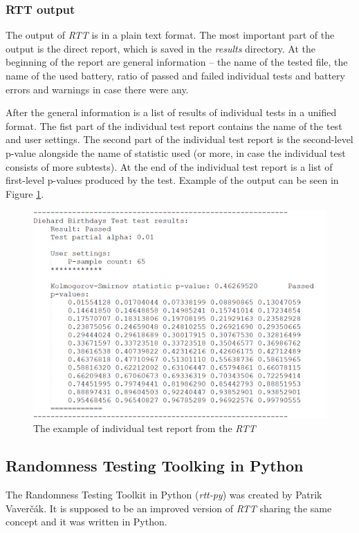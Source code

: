 \documentclass[
  digital,     %
  oneside,     %
  nosansbold,  %
  nocolorbold, %
  nolof,         %
  nolot,         %
]{fithesis4}
\begin{document}
\subsubsection{RTT output}
The output of \emph{RTT} is in a plain text format. The most important part of the output is the direct report, which is saved in the \emph{results} directory. At the beginning of the report are general information -- the name of the tested file, the name of the used battery, ratio of passed and failed individual tests and battery errors and warnings in case there were any.

After the general information is a list of results of individual tests in a unified format. The fist part of the individual test report contains the name of the test and user settings. The second part of the individual test report is the second-level p-value alongside the name of statistic used (or more, in case the individual test consists of more subtests). At the end of the individual test report is a list of first-level p-values produced by the test. Example of the output can be seen in Figure \ref{fig:rtt_output_example}.

\begin{figure}
  \begin{center}
    \includegraphics[width=12cm]{figures/rtt_dieharder_output.png}
  \end{center}
  \caption{The example of individual test report from the \emph{RTT}}
  \label{fig:rtt_output_example}
\end{figure}


\subsection{Randomness Testing Toolking in Python} \label{chap:sols-rtt-py}
The Randomness Testing Toolkit in Python (\emph{rtt-py}) was created by Patrik Vaverčák. It is supposed to be an improved version of \emph{RTT} sharing the same concept \cite[p.~24]{vavercak} and it was written in Python.
\end{document}
